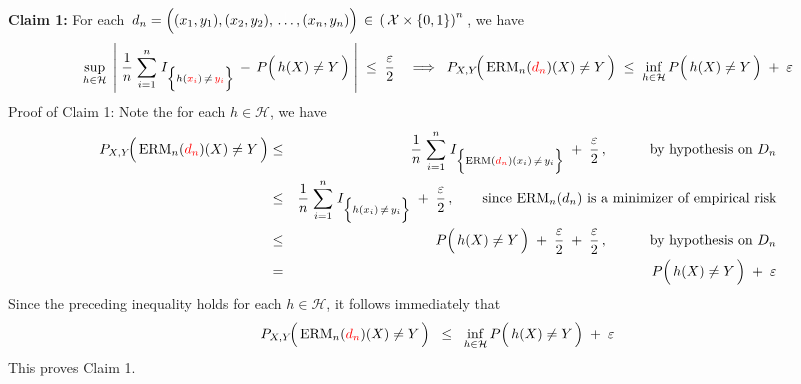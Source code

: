 \vskip 0.3cm
\noindent
\textbf{Claim 1:}\quad
For each
\,$d_{n} = \left((x_{1},y_{1}),(x_{2},y_{2}),\,\overset{{\color{white}\vert}}{\ldots}\,,(x_{n},y_{n})\right)
\,\in\, \left(\,\mathcal{X} \times \{0,1\} \right)^{n}$\,,
we have
\begin{equation*}
	\underset{h \in \mathcal{H}}{\sup}\;\left\vert\;
		\dfrac{1}{n}\;\overset{n}{\underset{i=1}{\sum}}\;
			I_{\left\{h({\color{red}x_{i}})\,\overset{{\color{white}.}}{\neq}\,{\color{red}y_{i}}\right\}}
			\,-\,
			P\!\left(\,\overset{{\color{white}.}}{h}(X) \neq Y \,\right)
		\;\right\vert
	\;\leq\;
		\dfrac{\varepsilon}{2}
\quad\Longrightarrow\;\;
	P_{X,Y}\!\!\left(\,\overset{{\color{white}.}}{\textnormal{ERM}}_{n}({\color{red}d_{n}})(X) \neq Y \,\right)
	\; \leq \;
		\underset{h\in\mathcal{H}}{\inf}\,P\!\left(\,\overset{{\color{white}.}}{h}(X) \neq Y \,\right)
		\; + \; \varepsilon
\end{equation*}
\vskip 0.2cm
\noindent
Proof of Claim 1:\quad
Note the for each $h \in \mathcal{H}$, we have
\begin{eqnarray*}
P_{X,Y}\!\!\left(\,\overset{{\color{white}.}}{\textnormal{ERM}}_{n}({\color{red}d_{n}})(X) \neq Y \,\right)
& \leq &
	\dfrac{1}{n}\;\overset{n}{\underset{i=1}{\sum}}\;
	I_{\left\{\textnormal{ERM}({\color{red}d_{n}})(x_{i})\,\overset{{\color{white}.}}{\neq}\,y_{i}\right\}}	
	\; + \;
	\dfrac{\varepsilon}{2}\,,
	\quad\quad\quad
	\textnormal{by hypothesis on $D_{n}$}
\\
& \leq &
	\dfrac{1}{n}\;\overset{n}{\underset{i=1}{\sum}}\;
	I_{\left\{h(x_{i})\,\overset{{\color{white}.}}{\neq}\,y_{i}\right\}}	
	\; + \;
	\dfrac{\varepsilon}{2}\,,
	\quad\quad
	\textnormal{since $\textnormal{ERM}_{n}(d_{n})$ is a minimizer of empirical risk}
\\
& \leq &
	P\!\left(\,\overset{{\color{white}.}}{h}(X) \neq Y \,\right)
	\; + \; \dfrac{\varepsilon}{2}
	\; + \; \dfrac{\varepsilon}{2}\,,
	\quad\quad\quad
	\textnormal{by hypothesis on $D_{n}$}
\\
& = &
	P\!\left(\,\overset{{\color{white}.}}{h}(X) \neq Y \,\right)
	\; + \; \varepsilon
\end{eqnarray*}
Since the preceding inequality holds for each $h \in \mathcal{H}$, it follows immediately that
\begin{equation*}
P_{X,Y}\!\!\left(\,\overset{{\color{white}.}}{\textnormal{ERM}}_{n}({\color{red}d_{n}})(X) \neq Y \,\right)
\;\; \leq \;\;
	\underset{h\in\mathcal{H}}{\inf}\,P\!\left(\,\overset{{\color{white}.}}{h}(X) \neq Y \,\right)
	\; + \; \varepsilon
\end{equation*}
This proves Claim 1.

